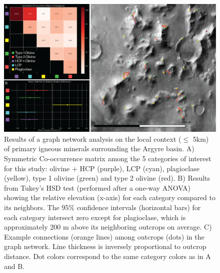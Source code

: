 \documentclass[12pt]{article}
\newenvironment{figurehere}[1][0.85]
  {\begin{figure}[p]
   \begin{minipage}[c][0.80\textheight][c]{\linewidth}
   \centering
   \setlength{\textfloatsep}{0pt}}
  {\end{minipage}
   \end{figure}}
\begin{document}
\begin{figurehere}
    \includegraphics[width=\textwidth]{extended_data/ED2_local_relationships.png}
    \caption[Results of a graph network analysis on the local context of primary igneous minerals.]{Results of a graph network analysis on the local context ($\leq$ 5km) of primary igneous minerals surrounding the Argyre basin. A) Symmetric Co-occurrence matrix among the 5 categories of interest for this study: olivine + HCP (purple), LCP (cyan), plagioclase (yellow), type 1 olivine (green) and type 2 olivine (red). B) Results from Tukey's HSD test (performed after a one-way ANOVA) showing the relative elevation (x-axis) for each category compared to its neighbors. The 95\% confidence intervals (horizontal bars) for each category intersect zero except for plagioclase, which is approximately 200 m above its neighboring outcrops on average. C) Example connections (orange lines) among outcrops (dots) in the graph network. Line thickness is inversely proportional to outcrop distance. Dot colors correspond to the same category colors as in A and B.}
    \label{fig:extended_data_figure2}
\end{figurehere}

\clearpage
\end{document}
